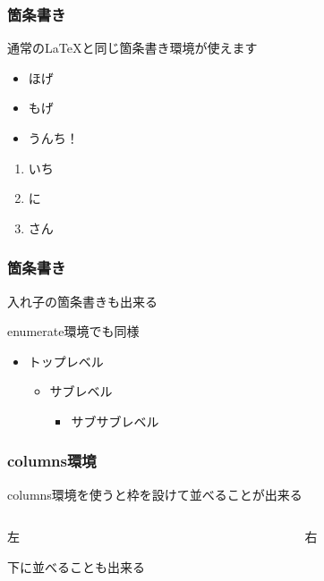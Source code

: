 \documentclass[dvipdfmx, 12pt]{beamer}  %
\begin{document}
  \begin{frame}
    \frametitle{箇条書き}
    
    通常の\LaTeX と同じ箇条書き環境が使えます
    \begin{itemize}
      \item ほげ
      \item もげ
      \item うんち！
    \end{itemize}

    \begin{enumerate}
      \item いち
      \item に
      \item さん
    \end{enumerate}
  \end{frame}

  \begin{frame}
    \frametitle{箇条書き}

    入れ子の箇条書きも出来る

    enumerate環境でも同様

    \begin{itemize}
      \item トップレベル
      \begin{itemize}
        \item サブレベル
        \begin{itemize}
          \item サブサブレベル
        \end{itemize}
      \end{itemize}
    \end{itemize}
  \end{frame}

  \begin{frame}
    \frametitle{columns環境}
    columns環境を使うと枠を設けて並べることが出来る

    \begin{columns}
      \begin{column}{.50\linewidth}
        \begin{block}{}
          左
        \end{block}

        \begin{block}
          下に並べることも出来る
        \end{block}
      \end{column}

      \begin{column}{.50\linewidth}
        \begin{block}{}
          右
        \end{block}
      \end{column}
    \end{columns}
  \end{frame}
\end{document}
